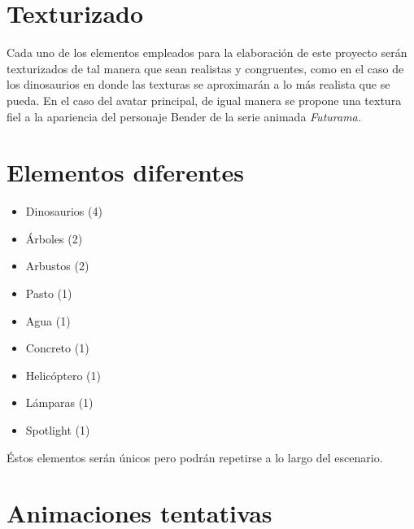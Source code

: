 \documentclass[12pt]{article} %
\begin{document}
\begin{center}
\begin{tabular}{ | m{19em} | m{19em} | }
			\hline
		\end{tabular}
	\end{center}

	\newpage
	
	\section{Texturizado}
	
	\setlength{\parindent}{1.0cm}
	Cada uno de los elementos empleados para la elaboración de este proyecto serán texturizados de tal manera que sean realistas y congruentes, como en el caso de los dinosaurios en donde las texturas se aproximarán a lo más realista que se pueda. En el caso del avatar principal, de igual manera se propone una textura fiel a la apariencia del personaje Bender de la serie animada \textit{Futurama.}
	\setlength{\parindent}{0.0cm}
	
	\section{Elementos diferentes}
	
	\begin{itemize}
		\item[\textbullet] Dinosaurios (4)
		\item[\textbullet] Árboles (2)
		\item[\textbullet] Arbustos (2)
		\item[\textbullet] Pasto (1)
		\item[\textbullet] Agua (1)
		\item[\textbullet] Concreto (1)
		\item[\textbullet] Helicóptero (1)
		\item[\textbullet] Lámparas (1)
		\item[\textbullet] Spotlight (1)
 	\end{itemize}
 	
 	Éstos elementos serán únicos pero podrán repetirse a lo largo del escenario.
 	
 	\section{Animaciones tentativas}
	
\end{document}
